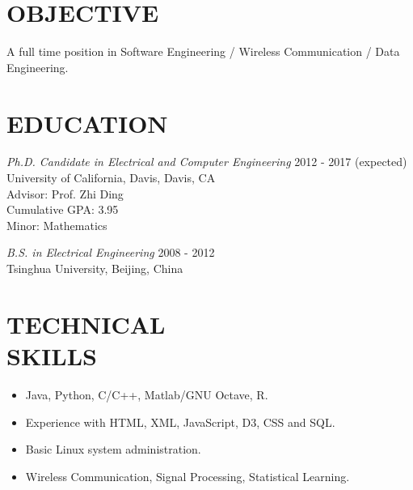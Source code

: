 \documentclass[margin]{res} %
\begin{document}
    \begin{resume}

     
        \section{OBJECTIVE}  
        A full time position in Software Engineering / Wireless
        Communication / Data Engineering.
    
    
        \section{EDUCATION}
    
        {\sl Ph.D. Candidate in Electrical and Computer Engineering} \hfill 2012 -
        2017 (expected) \\
        University of California, Davis, Davis, CA \\
        Advisor: Prof. Zhi Ding \\
        Cumulative GPA: 3.95 \\
        Minor: Mathematics 
        
        {\sl B.S. in Electrical Engineering}  \hfill 2008 - 2012\\
        Tsinghua University, Beijing, China
       
    
        \section{TECHNICAL \\ SKILLS}
        
        \begin{itemize}
            \item Java, Python, C/C++, Matlab/GNU Octave, R.
            \item Experience with HTML, XML, JavaScript, D3, CSS and SQL.
            \item Basic Linux system administration.
            \item Wireless Communication, Signal Processing, Statistical
            Learning.
        \end{itemize} 
    

\end{resume}
\end{document}
